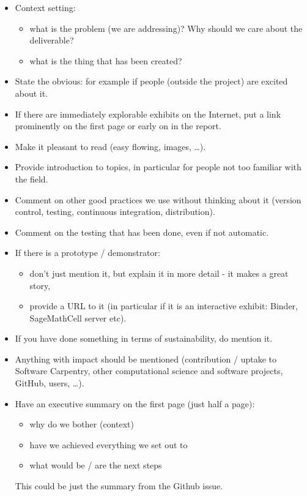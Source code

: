 \begin{itemize}
\item Context setting:
\begin{itemize}
\item what is the problem (we are addressing)? Why should we care about
the deliverable?
\item what is the thing that has been created?
\end{itemize}

\item State the obvious: for example if people (outside the project) are
excited about it.

\item If there are immediately explorable exhibits on the Internet, put a
link prominently on the first page or early on in the report.

\item Make it pleasant to read (easy flowing, images, \ldots{}).

\item Provide introduction to topics, in particular for people not too familiar with
the field.

\item Comment on other good practices we use without thinking about it
(version control, testing, continuous integration, distribution).

\item Comment on the testing that has been done, even if not automatic.

\item If there is a prototype / demonstrator:
\begin{itemize}
\item don't just mention it, but explain it in more detail - it makes a
great story,
\item provide a URL to it (in particular if it is an interactive
exhibit: Binder, SageMathCell server etc).
\end{itemize}

\item If you have done something in terms of sustainability, do mention
it.

\item Anything with impact should be mentioned (contribution / uptake to
Software Carpentry, other computational science and software
projects, GitHub, users, \ldots{}).

\item Have an executive summary on the first page (just half a page):
\begin{itemize}
\item why do we bother (context)
\item have we achieved everything we set out to
\item what would be / are the next steps
\end{itemize}
This could be just the summary from the Github issue.


\end{itemize}
